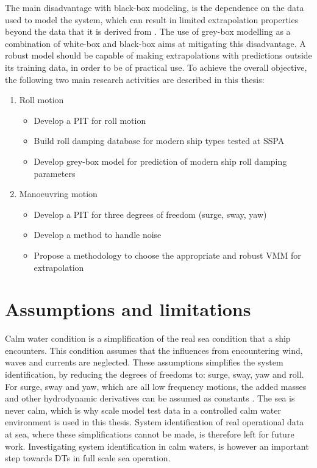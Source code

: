 The main disadvantage with black-box modeling, is the dependence on the data used to model the system, which can result in limited extrapolation properties beyond the data that it is derived from \cite{leifsson_grey-box_2008}. The use of grey-box modelling as a combination of white-box and black-box aims at mitigating this disadvantage. A robust model should be capable of making extrapolations with predictions outside its training data, in order to be of practical use.
\bigbreak
\noindent To achieve the overall objective, the following two main research activities are described in this thesis:
\begin{enumerate}

    \item Roll motion
    \begin{itemize}
        \item Develop a PIT for roll motion
        \item Build roll damping database for modern ship types tested at SSPA
        \item Develop grey-box model for prediction of modern ship roll damping parameters
    \end{itemize}
    
    \item Manoeuvring motion
    \begin{itemize}
        \item Develop a PIT for three degrees of freedom (surge, sway, yaw)
        \item Develop a method to handle noise
        \item Propose a methodology to choose the appropriate and robust VMM for extrapolation
 
    \end{itemize}
\end{enumerate}

\section{Assumptions and limitations}
Calm water condition is a simplification of the real sea condition that a ship encounters. This condition assumes that the influences from encountering wind, waves and currents are neglected. These assumptions simplifies the system identification, by reducing the degrees of freedoms to: surge, sway, yaw and roll. For surge, sway and yaw, which are all low frequency motions, the added masses and other hydrodynamic derivatives can be assumed as constants \cite{fossen_handbook_2021}.  
The sea is never calm, which is why scale model test data in a controlled calm water environment is used in this thesis. System identification of real operational data at sea, where these simplifications cannot be made, is  therefore left for future work. Investigating system identification in calm waters, is however an important step towards DTs in full scale sea operation.

